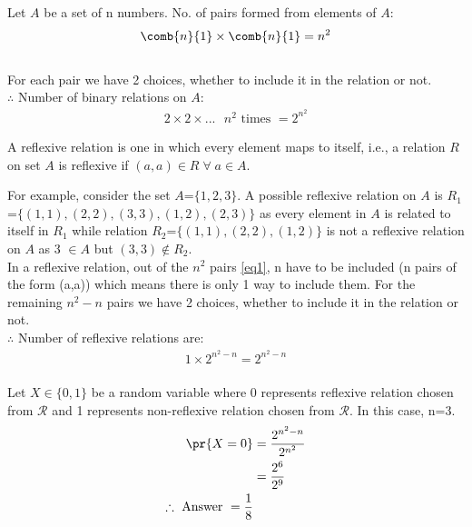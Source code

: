 Let $A$ be a set of n numbers. No. of pairs formed from elements of $A$:\\
\begin{align}
     \comb{n}{1} \times \comb{n}{1} = n^2\label{cs2020:eq1}
\end{align}
\\For each pair we have 2 choices, whether to include it in the relation or not. \\$\therefore$ Number of binary relations on $A$:\\
\begin{align}
    2\times2\times...\text{ $n^{2}$ times } = 2^{n^2}\label{cs2020:eq2}
\end{align}
\begin{definition}
A reflexive relation is one in which every element maps to itself, i.e., a relation $R$ on set $A$ is reflexive if $(a,a) \in R\; \forall\; a \in A$.
\end{definition}
For example, consider the set $A$\hspace{0.2cm}=\hspace{0.2cm}$\{1,2,3\}$. A possible reflexive relation on $A$ is $R_1$\hspace{0.2cm}=\hspace{0.2cm}$\{(1,1), (2,2), (3,3), (1,2), (2,3)\}$ as every element in $A$ is related to itself in $R_1$ while relation $R_2$\hspace{0.2cm}=\hspace{0.2cm}$\{(1,1),(2,2),(1,2)\}$ is not a reflexive relation on $A$ as 3 $\in A$ but $(3,3) \notin R_2$.\\
In a reflexive relation, out of the $n^2$ pairs \eqref{eq1}, n have to be included (n pairs of the form (a,a)) which means there is only 1 way to include them. For the remaining $n^2-n$ pairs we have 2 choices, whether to include it in the relation or not.\\
$\therefore$ Number of reflexive relations are:\\
\begin{align}
    1\times2^{n^{2}-n} = 2^{n^{2}-n} \label{cs2020:eq3}
\end{align}
\\
Let $X \in \{0,1\}$ be a random variable where 0 represents reflexive relation chosen from $\mathcal{R}$ and 1 represents non-reflexive relation chosen from $\mathcal{R}$. In this case, n=3.
\\
\begin{align}
    \pr{X=0} &= \frac{2^{n^{2}-n}}{2^{n^{2}}} \nonumber\\
    &= \frac{2^{6}}{2^{9}}\\
    \therefore \text{ Answer }= \frac{1}{8}
\end{align}
